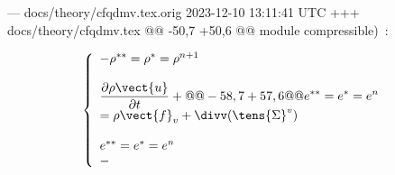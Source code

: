 --- docs/theory/cfqdmv.tex.orig	2023-12-10 13:11:41 UTC
+++ docs/theory/cfqdmv.tex
@@ -50,7 +50,6 @@ module compressible)~:
 
 \begin{equation}\label{Cfbl_Cfqdmv_eq_qdm_cfqdmv}
 \left\{\begin{array}{l}
-
 \rho^{**}=\rho^{*}=\rho^{n+1}\\
 \\
 \displaystyle\frac{\partial \rho\vect{u}}{\partial t}+
@@ -58,7 +57,6 @@ e^{**}=e^{*}=e^n\\
 = \rho \vect{f}_v + \divv(\tens{\Sigma}^v)\\
 \\
 e^{**}=e^{*}=e^n\\
-
 \end{array}\right.
 \end{equation}
 
